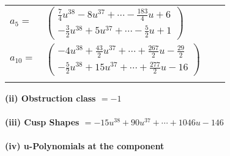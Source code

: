 \documentclass[1p]{elsarticle_modified}
\theoremstyle{definition}
\begin{document}
\begin{tabular}{m{7pt} m{180pt} m{7pt} m{180pt} }
\flushright $a_{5}=$&$\begin{pmatrix}\frac{7}{4} u^{38}-8 u^{37}+\cdots-\frac{183}{4} u+6\\-\frac{3}{2} u^{38}+5 u^{37}+\cdots-\frac{5}{2} u+1\end{pmatrix}$ \\
\flushright $a_{10}=$&$\begin{pmatrix}-4 u^{38}+\frac{43}{2} u^{37}+\cdots+\frac{267}{2} u-\frac{29}{2}\\-\frac{5}{2} u^{38}+15 u^{37}+\cdots+\frac{277}{2} u-16\end{pmatrix}$\\&\end{tabular}
\flushleft \textbf{(ii) Obstruction class $= -1$}\\~\\
\flushleft \textbf{(iii) Cusp Shapes $= -15 u^{38}+90 u^{37}+\cdots+1046 u-146$}\\~\\
\newpage\renewcommand{\arraystretch}{1}
\flushleft \textbf{(iv) u-Polynomials at the component}\newline \\
\end{document}
